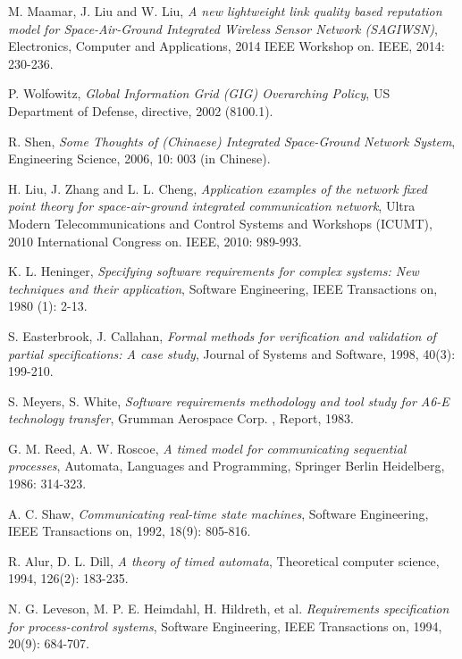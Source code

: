 
\begin{thebibliography}{2}
\setlength{\baselineskip}{25pt}

M. Maamar, J. Liu and W. Liu, \emph{A new lightweight link quality based reputation model for Space-Air-Ground Integrated Wireless Sensor Network (SAGIWSN)}, Electronics, Computer and Applications, 2014 IEEE Workshop on. IEEE, 2014: 230-236.

P. Wolfowitz, \emph{Global Information Grid (GIG) Overarching Policy}, US Department of Defense, directive, 2002 (8100.1).

R. Shen, \emph{Some Thoughts of (Chinaese) Integrated Space-Ground Network System}, Engineering Science, 2006, 10: 003 (in Chinese).

H. Liu, J. Zhang and L. L. Cheng, \emph{Application examples of the network fixed point theory for space-air-ground integrated communication network}, Ultra Modern Telecommunications and Control Systems and Workshops (ICUMT), 2010 International Congress on. IEEE, 2010: 989-993.

K. L. Heninger, \emph{Specifying software requirements for complex systems: New techniques and their application}, Software Engineering, IEEE Transactions on, 1980 (1): 2-13.

S. Easterbrook, J. Callahan, \emph{Formal methods for verification and validation of partial specifications: A case study}, Journal of Systems and Software, 1998, 40(3): 199-210.

S. Meyers, S. White, \emph{Software requirements methodology and tool study for A6-E technology transfer}, Grumman Aerospace Corp. , Report, 1983.

G. M. Reed, A. W. Roscoe, \emph{A timed model for communicating sequential processes}, Automata, Languages and Programming, Springer Berlin Heidelberg, 1986: 314-323.

A. C. Shaw, \emph{Communicating real-time state machines}, Software Engineering, IEEE Transactions on, 1992, 18(9): 805-816.

R. Alur, D. L. Dill, \emph{A theory of timed automata}, Theoretical computer science, 1994, 126(2): 183-235.

N. G. Leveson, M. P. E. Heimdahl, H. Hildreth, et al. \emph{Requirements specification for process-control systems}, Software Engineering, IEEE Transactions on, 1994, 20(9): 684-707.


\end{thebibliography}
